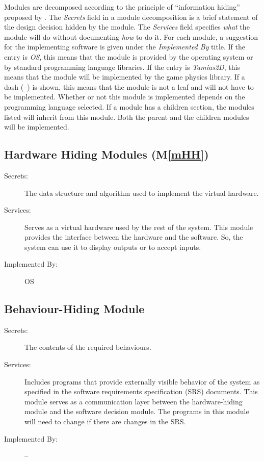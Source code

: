 \documentclass[12pt]{article}
\newcommand{\mref}[1]{M\ref{#1}}
\newcommand{\progname}{Tamias2D}
\begin{document}
Modules are decomposed according to the principle of ``information hiding''
proposed by \citet{ParnasEtAl1984}. The \emph{Secrets} field in a module
decomposition is a brief statement of the design decision hidden by the
module. The \emph{Services} field specifies \emph{what} the module will do
without documenting \emph{how} to do it. For each module, a suggestion for the implementing software is given under the \emph{Implemented By} title. If the entry is \emph{OS}, this means that the module is provided by the operating system or by standard programming language libraries. If the entry is \emph{\progname}, this means that the module will be implemented by the game physics library.  
If a dash (\emph{--}) is shown, this means
that the module is not a leaf and will not have to be implemented. Whether or
not this module is implemented depends on the programming language
selected.
If a module has a children section, the modules listed will inherit from  
this module. Both the parent and the children modules will be implemented.

\subsection{Hardware Hiding Modules (\mref{mHH})}

\begin{description}
\item[Secrets:]The data structure and algorithm used to implement the virtual
  hardware.
\item[Services:] Serves as a virtual hardware used by the rest of the
  system. This module provides the interface between the hardware and the
  software. So, the system can use it to display outputs or to accept inputs.
\item[Implemented By:] OS
\end{description}

\subsection{Behaviour-Hiding Module}

\begin{description}
\item[Secrets:]The contents of the required behaviours.
\item[Services:]Includes programs that provide externally visible behavior of
  the system as specified in the software requirements specification (SRS)
  documents. This module serves as a communication layer between the
  hardware-hiding module and the software decision module. The programs in this module will need to change if there are changes in the SRS.
\item[Implemented By:] --
\end{description}
\end{document}
